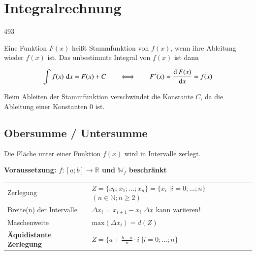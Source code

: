 \section{Integralrechnung}{493}

Eine Funktion $F(x)$ heißt Stammfunktion von $f(x)$, wenn ihre Ableitung wieder $f(x)$ ist. Das unbestimmte Integral von $f(x)$ ist dann

$$ \int f(x) \,  \mathop{} \! \mathrm{d} x = F(x) + C  \quad \quad \Longleftrightarrow \quad \quad F'(x) = \frac{\mathop{} \! \mathrm{d} \:F(x)}{\mathop{} \! \mathrm{d} x} = f(x)$$

Beim Ableiten der Stammfunktion verschwindet die Konstante $C$, da die Ableitung einer Konstanten $0$ ist.


\subsection{Obersumme / Untersumme}

Die Fläche unter einer Funktion $f(x)$ wird in Intervalle zerlegt.

\textbf{Voraussetzung: $f: [a;b] \to \mathbb{R}$ und $\mathbb{W}_f$ beschränkt} 

\renewcommand{\arraystretch}{1.5}
\begin{tabular}{@{}ll@{}}
    Zerlegung                           & $Z = \lbrace x_0; x_1; \ldots ; x_n \rbrace = \lbrace x_i$  $\vert i=0; \ldots ; n \rbrace$ \quad $(n \in \mathbb{N}; n \geq 2)$ \\
    Breite(n) der Intervalle            & $\Delta x_i = x_{i+1} - x_i$ \quad $\Delta x$ kann variieren! \\
    Maschenweite                        & $\mathrm{max}(\Delta x_i) = d(Z)$ \\
    \textbf{Äquidistante Zerlegung}     & $Z = \lbrace a + \frac{b-a}{n} \cdot i $ $\vert i=0; \ldots; n \rbrace$
\end{tabular}

\vspace{0.4cm}

